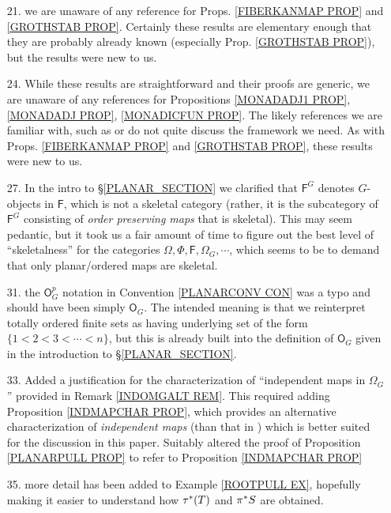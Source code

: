 \documentclass{article}
\begin{document}
\begin{itemize}
	\item[21.] we are unaware of any reference for Props. 
	\ref{FIBERKANMAP PROP} and \ref{GROTHSTAB PROP}.
	Certainly these results are elementary enough that they are probably already known (especially Prop. \ref{GROTHSTAB PROP}),
	but the results were new to us. 
	
	\item[24.] While these results are straightforward 
	and their proofs are generic, 
	we are unaware of any references for Propositions \ref{MONADADJ1 PROP}, \ref{MONADADJ PROP}, \ref{MONADICFUN PROP}. The likely references we are familiar with, such as 
	\cite{Bo94} or \cite{Ri17} do not quite discuss the framework we need.
	As with Props. 
	\ref{FIBERKANMAP PROP} and \ref{GROTHSTAB PROP},
	these results were new to us.
	
	\item[27.] In the intro to \S \ref{PLANAR_SECTION} we
	clarified that $\mathsf{F}^G$ denotes $G$-objects in $\mathsf{F}$,
	which is not a skeletal category (rather, it is the subcategory of $\mathsf{F}^G$ consisting of \emph{order preserving maps} that is skeletal).
	This may seem pedantic,
	but it took us a fair amount of time to figure out the best level of ``skeletalness'' for the categories 
	$\Omega, \Phi, \mathsf{F}, \Omega_G, \cdots$, 
	which seems to be to demand that only planar/ordered maps are skeletal.
	
	\item[31.] the $\mathsf{O}^p_G$ notation in 
	Convention \ref{PLANARCONV CON}
	was a typo and should have been simply $\mathsf{O}_G$.
	The intended meaning is that we reinterpret totally ordered finite sets as having underlying set of the form
	$\{1<2<3<\cdots <n\}$,
	but this is already built into the definition of 
	$\mathsf{O}_G$ given in the introduction to
	\S \ref{PLANAR_SECTION}.

  \item[33.] Added a justification for 
	the characterization of ``independent maps in $\Omega_G$''
	provided in Remark \ref{INDOMGALT REM}.
	This required adding 
	Proposition \ref{INDMAPCHAR PROP},
	which provides an alternative characterization of \emph{independent maps}
	(than that in \cite[Def. 5.28]{Pe17})
	which is better suited for the discussion in this paper.
	Suitably altered the proof of Proposition \ref{PLANARPULL PROP}
	to refer to Proposition \ref{INDMAPCHAR PROP}
        
	\item[35.] more detail has been added to Example \ref{ROOTPULL EX}, hopefully making it easier to understand 
	how $\tau^{\**}(T)$ and $\pi^{\**}S$ are obtained.
	

\end{itemize}
\end{document}
